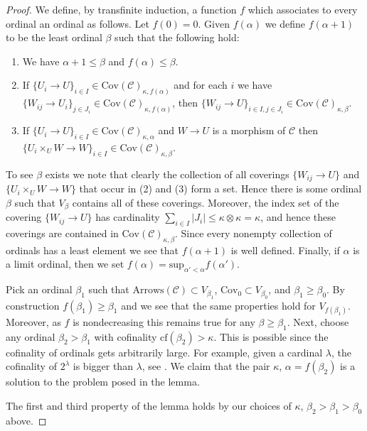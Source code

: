 \begin{proof}
\medskip\noindent
We define, by transfinite induction, a function $f$ which associates
to every ordinal an ordinal as follows. Let $f(0) = 0$.
Given $f(\alpha)$ we define $f(\alpha + 1)$ to be the least
ordinal $\beta$ such that the following hold:
\begin{enumerate}
\item We have $\alpha + 1 \leq \beta$ and $f(\alpha) \leq \beta$.
\item If $\{U_i \to U\}_{i\in I}
\in \text{Cov}(\mathcal{C})_{\kappa, f(\alpha)}$
and for each $i$ we have
$\{W_{ij} \to U_i\}_{j\in J_i}
\in \text{Cov}(\mathcal{C})_{\kappa, f(\alpha)}$,
then
$\{W_{ij} \to U\}_{i \in I, j\in J_i}
\in \text{Cov}(\mathcal{C})_{\kappa, \beta}$.
\item If $\{U_i \to U\}_{i\in I}
\in \text{Cov}(\mathcal{C})_{\kappa, \alpha}$
and $W \to U$ is a morphism of $\mathcal{C}$ then
$\{U_i \times_U W \to W \}_{i\in I}
\in \text{Cov}(\mathcal{C})_{\kappa, \beta}$.
\end{enumerate}
To see $\beta$ exists we note that clearly the collection of all
coverings $\{W_{ij} \to U\}$ and $\{U_i \times_U W \to W \}$ that occur in
(2) and (3) form a set. Hence there is some ordinal $\beta$ such that
$V_\beta$ contains all of these coverings. Moreover, the index set
of the covering $\{W_{ij} \to U\}$ has cardinality
$\sum_{i \in I} |J_i| \leq \kappa \otimes \kappa = \kappa$, and
hence these coverings are contained in
$\text{Cov}(\mathcal{C})_{\kappa, \beta}$.
Since every nonempty collection of ordinals has a least element
we see that $f(\alpha + 1)$ is well defined. Finally, if $\alpha$
is a limit ordinal, then we set
$f(\alpha) = \text{sup}_{\alpha' < \alpha} f(\alpha')$.

\medskip\noindent
Pick an ordinal $\beta_1$ such that
$\text{Arrows}(\mathcal{C}) \subset V_{\beta_1}$,
$\text{Cov}_0 \subset V_{\beta_0}$,
and $\beta_1 \geq \beta_0$.
By construction $f(\beta_1) \geq \beta_1$ and we see that
the same properties hold for $V_{f(\beta_1)}$. Moreover, as $f$ is
nondecreasing this remains true for any $\beta \geq \beta_1$.
Next, choose any ordinal $\beta_2 > \beta_1$ with
cofinality $\text{cf}(\beta_2) > \kappa$. This is possible
since the cofinality of ordinals gets arbitrarily large.
For example, given a cardinal $\lambda$,
the cofinality of $2^\lambda$ is bigger than $\lambda$, see
\cite[Chapter I, Corollary 10.41]{Kunen}. We claim that
the pair $\kappa$,
$\alpha = f(\beta_2)$ is a solution to the problem posed in the lemma.

\medskip\noindent
The first and third property of the lemma holds by our choices
of $\kappa$, $\beta_2 > \beta_1 > \beta_0$ above.


\end{proof}
